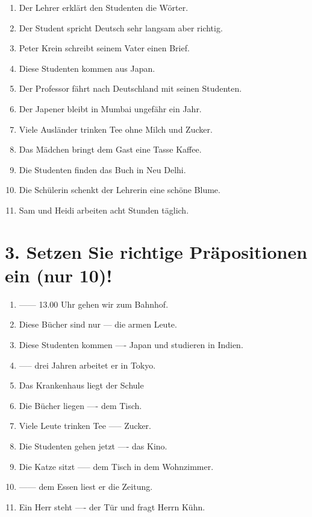 \documentclass[a4paper,12pt]{article}
\begin{document}
\begin{enumerate}[label=(\alph*)]
    \item Der Lehrer erklärt den Studenten die Wörter.
    \item Der Student spricht Deutsch sehr langsam aber richtig.
    \item Peter Krein schreibt seinem Vater einen Brief.
    \item Diese Studenten kommen aus Japan.
    \item Der Professor fährt nach Deutschland mit seinen Studenten.
    \item Der Japener bleibt in Mumbai ungefähr ein Jahr.
    \item Viele Ausländer trinken Tee ohne Milch und Zucker.
    \item Das Mädchen bringt dem Gast eine Tasse Kaffee.
    \item Die Studenten finden das Buch in Neu Delhi.
    \item Die Schülerin schenkt der Lehrerin eine schöne Blume.
    \item Sam und Heidi arbeiten acht Stunden täglich.
\end{enumerate}

\section*{3. Setzen Sie richtige Präpositionen ein (nur 10)!}

\begin{enumerate}[label=(\alph*)]
    \item ------ 13.00 Uhr gehen wir zum Bahnhof.
    \item Diese Bücher sind nur --- die armen Leute.
    \item Diese Studenten kommen ---- Japan und studieren in Indien.
    \item ----- drei Jahren arbeitet er in Tokyo.
    \item Das Krankenhaus liegt der Schule \underline{\hspace{1cm}}
    \item Die Bücher liegen ---- dem Tisch.
    \item Viele Leute trinken Tee ----- Zucker.
    \item Die Studenten gehen jetzt ---- das Kino.
    \item Die Katze sitzt ----- dem Tisch in dem Wohnzimmer.
    \item ------ dem Essen liest er die Zeitung.
    \item Ein Herr steht ---- der Tür und fragt Herrn Kühn.
\end{enumerate}
\end{document}
